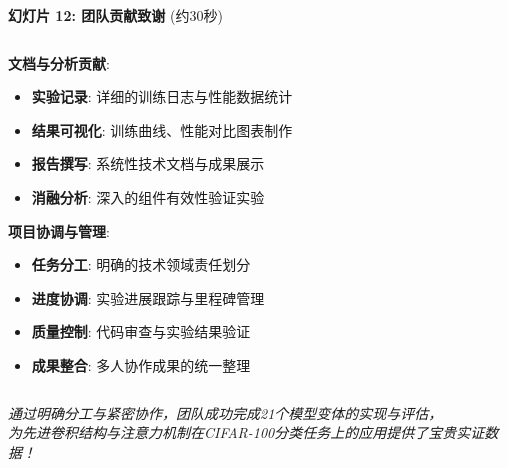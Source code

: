 \documentclass[10pt]{beamer}
\begin{document}
\begin{frame}{\textbf{幻灯片 12: 团队贡献致谢} (约30秒)}
{\begin{columns}[T]
\begin{column}{0.48\textwidth}
        \textbf{文档与分析贡献}:
        \begin{itemize}
            \item \textbf{实验记录}: 详细的训练日志与性能数据统计
            \item \textbf{结果可视化}: 训练曲线、性能对比图表制作
            \item \textbf{报告撰写}: 系统性技术文档与成果展示
            \item \textbf{消融分析}: 深入的组件有效性验证实验
        \end{itemize}
        
        \textbf{项目协调与管理}:
        \begin{itemize}
            \item \textbf{任务分工}: 明确的技术领域责任划分
            \item \textbf{进度协调}: 实验进展跟踪与里程碑管理
            \item \textbf{质量控制}: 代码审查与实验结果验证
            \item \textbf{成果整合}: 多人协作成果的统一整理
        \end{itemize}
    \end{column}
\end{columns}
}

\vspace{0.5em}
\centering
{\small \textit{通过明确分工与紧密协作，团队成功完成21个模型变体的实现与评估，\\
为先进卷积结构与注意力机制在CIFAR-100分类任务上的应用提供了宝贵实证数据！}}

\end{frame}
\end{document}
